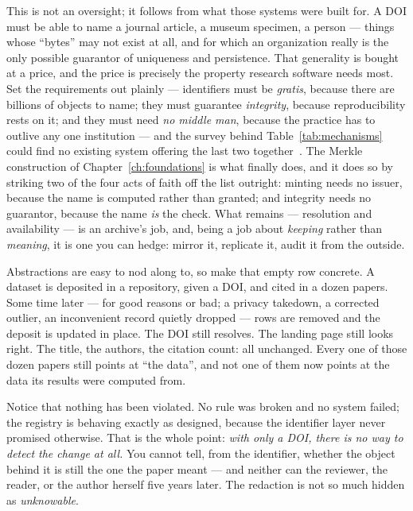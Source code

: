 
This is not an oversight; it follows from what those systems were built for. A DOI must be able to
name a journal article, a museum specimen, a person --- things whose \enquote{bytes} may not exist at
all, and for which an organization really is the only possible guarantor of uniqueness and
persistence. That generality is bought at a price, and the price is precisely the property research
software needs most. Set the requirements out plainly --- identifiers must be \emph{gratis}, because
there are billions of objects to name; they must guarantee \emph{integrity}, because reproducibility
rests on it; and they must need \emph{no middle man}, because the practice has to outlive any one
institution --- and the survey behind Table~\ref{tab:mechanisms} could find no existing system
offering the last two together~\autocite{swhipres2018}. The Merkle construction of
Chapter~\ref{ch:foundations} is what finally does, and it does so by striking two of the four acts of
faith off the list outright: minting needs no issuer, because the name is computed rather than
granted; and integrity needs no guarantor, because the name \emph{is} the check. What remains ---
resolution and availability --- is an archive's job, and, being a job about \emph{keeping} rather
than \emph{meaning}, it is one you can hedge: mirror it, replicate it, audit it from the outside.

Abstractions are easy to nod along to, so make that empty row concrete. A dataset is deposited in a
repository, given a DOI, and cited in a dozen papers. Some time later --- for good reasons or bad; a
privacy takedown, a corrected outlier, an inconvenient record quietly dropped --- rows are removed
and the deposit is updated in place. The DOI still resolves. The landing page still looks right. The
title, the authors, the citation count: all unchanged. Every one of those dozen papers still points
at \enquote{the data}, and not one of them now points at the data its results were computed from.

Notice that nothing has been violated. No rule was broken and no system failed; the registry is
behaving exactly as designed, because the identifier layer never promised otherwise. That is the
whole point: \emph{with only a DOI, there is no way to detect the change at all.} You cannot tell,
from the identifier, whether the object behind it is still the one the paper meant --- and neither
can the reviewer, the reader, or the author herself five years later. The redaction is not so much
hidden as \emph{unknowable}.

